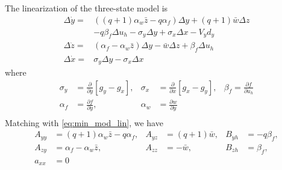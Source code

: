 \documentclass[letterpaper, 10 pt,  conference]{ieeeconf}  %
\begin{document}
 The linearization of the three-state model is
\begin{equation*}
\begin{aligned}
\Delta\dot{y}=&((q+1)\alpha_w\bar z-q\alpha_f)\Delta y+(q+1)\bar{w}\Delta z\\
&-q\beta_f \Delta u_h-\sigma_y\Delta y+\sigma_x\Delta x-V_y d_y\\
\Delta\dot{z}=&(\alpha_f-\alpha_w\bar z)\Delta y-\bar{w}\Delta z+\beta_f \Delta u_h\\
\Delta\dot{x}=&\sigma_y\Delta y-\sigma_x\Delta x
\end{aligned}
\end{equation*}
where
\begin{equation*}
\begin{aligned}
\sigma_y&=\frac{\partial}{\partial y}[g_y-g_x], &\sigma_x&=\frac{\partial}{\partial x}[g_x-g_y], &\beta_f=\frac{\partial f}{\partial u_h}\\
\alpha_f&=\frac{\partial f}{\partial y},&\alpha_w&=\frac{\partial w}{\partial y}\\
\end{aligned}
\end{equation*}
Matching with \eqref{eq:min_mod_lin}, we have
\begin{equation*}
\begin{aligned}
A_{yy}&=(q+1)\alpha_w\bar z-q\alpha_f,& A_{yz}&=(q+1)\bar{w},&B_{yh}&=-q\beta_f,\\
A_{zy}&=\alpha_f-\alpha_w\bar z,& A_{zz}&=-\bar{w},&B_{zh}&=\beta_f,\\
a_{xx}&=0
\end{aligned}
\end{equation*}
\end{document}
